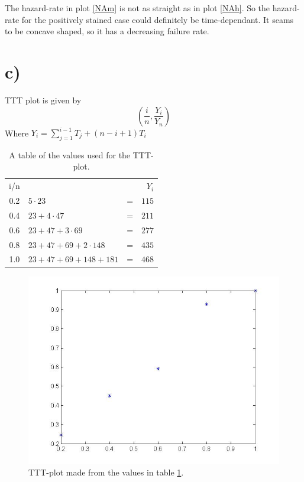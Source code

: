 \documentclass[10pt, a4paper]{article}
\begin{document}
The hazard-rate in plot \ref{NAm} is not as straight as in plot \ref{NAh}. So the hazard-rate for the positively stained case could definitely be time-dependant. It seams to be concave shaped, so it has a decreasing failure rate. 

\section*{c)}

TTT plot is given by $$ (\frac{i}{n}, \frac{Y_i}{Y_n}) $$
Where $Y_i = \sum \limits_{j = 1}^{i-1} T_j + (n-i+1)T_i  $ 

\begin{center}
\begin{table}[h!]
\centering
\begin{tabular}{ c l c r }

	i/n &  & & $Y_i$\\
0.2	& $5\cdot 23 $ & = & $ 115 $\\
0.4	&$ 23+4\cdot47 $ & = & $ 211 $\\
0.6	&$ 23+47+3\cdot69 $ & = & $277$ \\
0.8	&$ 23+47+69+2\cdot148 $ & = & $ 435 $ \\
1.0 &$ 23+47+69+148+181 $ & = & $ 468 $\\
\end{tabular}
\caption{A table of the values used for the TTT-plot.}
\label{TTTt}
\end{table}
\end{center}

\begin{center}
\begin{figure}[h!]
\centering
\includegraphics[scale=0.50]{TTT1}
\caption{TTT-plot made from the values in table \ref{TTTt}.}
\label{TTTh}
\end{figure}
\end{center}
\end{document}
